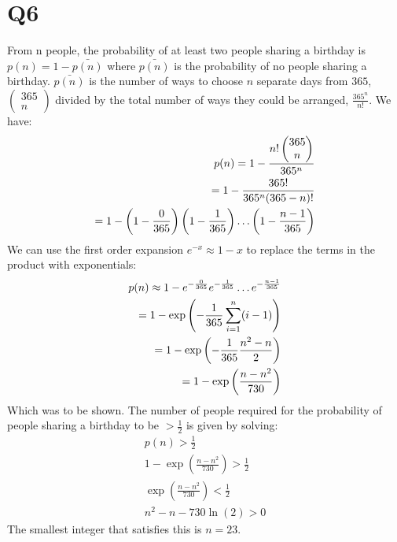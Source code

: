 \documentclass[12pt]{article}
\begin{document}
\section*{Q6}
From n people, the probability of at least two people sharing a birthday is $p(n)=1-\bar{p(n)}$ where $\bar{p(n)}$ is the probability of no people sharing a birthday. $\bar{p(n)}$ is the number of ways to choose $n$ separate days from $365$, $\left(\begin{matrix}365 \\ n\end{matrix}\right)$ divided by the total number of ways they could be arranged, $\frac{365^n}{n!}$. We have:
\begin{align*}
	p(n) = 1-\frac{n!\left(\begin{matrix}365\\n\end{matrix}\right)}{365^n}\\
	= 1-\frac{365!}{365^n(365-n)!}\\
	=1-\left(1-\frac{0}{365}\right)\left(1-\frac{1}{365}\right)\mathellipsis\left(1-\frac{n-1}{365}\right)
\end{align*}
We can use the first order expansion $e^{-x}\approx 1-x$ to replace the terms in the product with exponentials:
\begin{align}
	p(n)\approx 1-e^{-\frac{0}{365}}e^{-\frac{1}{365}}\mathellipsis e^{-\frac{n-1}{365}}\\
	=1-\exp\left(-\frac{1}{365}\sum_{i=1}^n(i-1)\right)\\
	=1-\exp\left(-\frac{1}{365}\frac{n^2-n}{2}\right)\\
	=1-\exp\left(\frac{n-n^2}{730}\right)
\end{align}
Which was to be shown.
The number of people required for the probability of people sharing a birthday to be $>\frac{1}{2}$ is given by solving:
\begin{align}
	p(n) > \frac{1}{2}\\
	1-\exp\left(\frac{n-n^2}{730}\right)>\frac{1}{2}\\
	\exp\left(\frac{n-n^2}{730}\right)<\frac{1}{2}\\
	n^2-n-730\ln(2)>0
\end{align}
The smallest integer that satisfies this is $n=23$.
\end{document}

